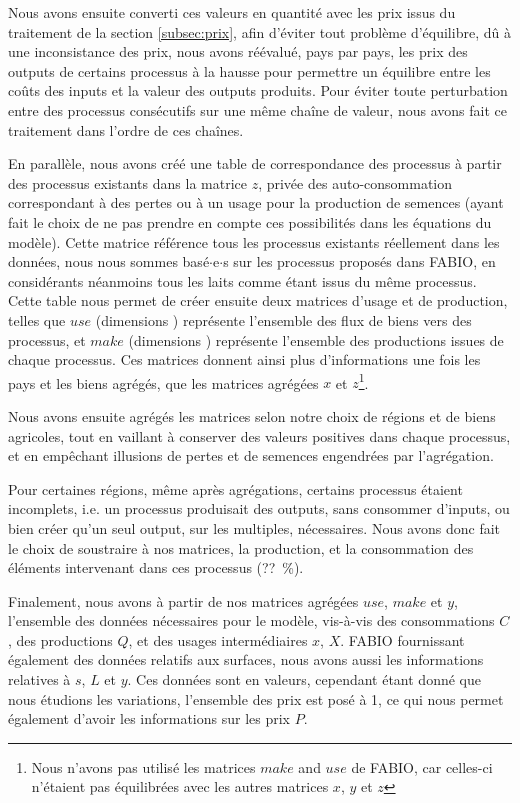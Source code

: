 Nous avons ensuite converti ces valeurs en quantité avec les prix issus du traitement de la section \ref{subsec:prix}, afin d'éviter tout problème d'équilibre, dû à une inconsistance des prix, nous avons réévalué, pays par pays, les prix des outputs de certains processus à la hausse pour permettre un équilibre entre les coûts des inputs et la valeur des outputs produits. Pour éviter toute perturbation entre des processus consécutifs sur une même chaîne de valeur, nous avons fait ce traitement dans l'ordre de ces chaînes.

En parallèle, nous avons créé une table de correspondance des processus à partir des processus existants dans la matrice $z$, privée des auto-consommation correspondant à des pertes ou à un usage pour la production de semences (ayant fait le choix de ne pas prendre en compte ces possibilités dans les équations du modèle). Cette matrice référence tous les processus existants réellement dans les données, nous nous sommes basé$\cdot$e$\cdot$s sur les processus proposés dans FABIO, en considérants néanmoins tous les laits comme étant issus du même processus. Cette table nous permet de créer ensuite deux matrices d'usage et de production, telles que $use$ (dimensions ) représente l'ensemble des flux de biens vers des processus, et $make$ (dimensions ) représente l'ensemble des productions issues de chaque processus. Ces matrices donnent ainsi plus d'informations une fois les pays et les biens agrégés, que les matrices agrégées $x$ et $z$\footnote{Nous n'avons pas utilisé les matrices $make$ and $use$ de FABIO, car celles-ci n'étaient pas équilibrées avec les autres matrices $x$, $y$ et $z$}.

Nous avons ensuite agrégés les matrices selon notre choix de régions et de biens agricoles, tout en vaillant à conserver des valeurs positives dans chaque processus, et en empêchant illusions de pertes et de semences engendrées par l'agrégation.

Pour certaines régions, même après agrégations, certains processus étaient incomplets, i.e. un processus produisait des outputs, sans consommer d'inputs, ou bien créer qu'un seul output, sur les multiples, nécessaires. Nous avons donc fait le choix de soustraire à nos matrices, la production, et la consommation des éléments intervenant dans ces processus (??~\%).

Finalement, nous avons à partir de nos matrices agrégées $use$, $make$ et $y$, l'ensemble des données nécessaires pour le modèle, vis-à-vis des consommations $C$, des productions $Q$, et des usages intermédiaires $x$, $X$. FABIO fournissant également des données relatifs aux surfaces, nous avons aussi les informations relatives à $s$, $L$ et $y$. Ces données sont en valeurs, cependant étant donné que nous étudions les variations, l'ensemble des prix est posé à 1, ce qui nous permet également d'avoir les informations sur les prix $P$.


